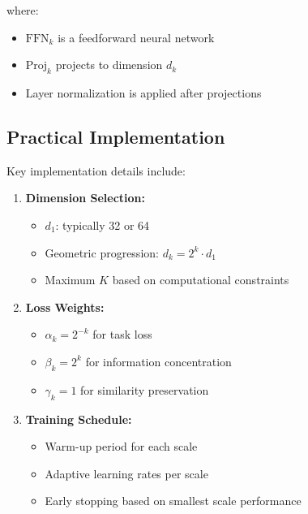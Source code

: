 where:
\begin{itemize}
    \item $\text{FFN}_k$ is a feedforward neural network
    \item $\text{Proj}_k$ projects to dimension $d_k$
    \item Layer normalization is applied after projections
\end{itemize}

\subsection{Practical Implementation}

Key implementation details include:

\begin{enumerate}
    \item \textbf{Dimension Selection:}
    \begin{itemize}
        \item $d_1$: typically 32 or 64
        \item Geometric progression: $d_k = 2^k \cdot d_1$
        \item Maximum $K$ based on computational constraints
    \end{itemize}

    \item \textbf{Loss Weights:}
    \begin{itemize}
        \item $\alpha_k = 2^{-k}$ for task loss
        \item $\beta_k = 2^k$ for information concentration
        \item $\gamma_k = 1$ for similarity preservation
    \end{itemize}

    \item \textbf{Training Schedule:}
    \begin{itemize}
        \item Warm-up period for each scale
        \item Adaptive learning rates per scale
        \item Early stopping based on smallest scale performance
    \end{itemize}
\end{enumerate}